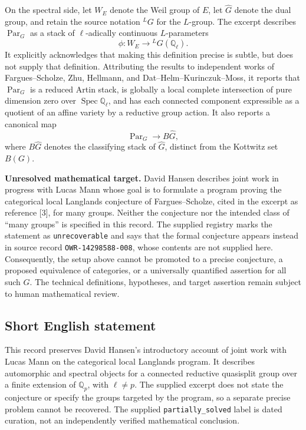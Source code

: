\documentclass[11pt]{article}
\newcommand{\Q}{\mathbb{Q}}
\begin{document}
On the spectral side, let \(W_E\) denote the Weil group of \(E\), let \(\widehat G\) denote the dual group, and retain the source notation \({}^{L}G\) for the \(L\)-group. The excerpt describes \(\operatorname{Par}_G\) as a stack of \(\ell\)-adically continuous \(L\)-parameters
\[
\phi:W_E\longrightarrow {}^{L}G(\Q_\ell).
\]
It explicitly acknowledges that making this definition precise is subtle, but does not supply that definition. Attributing the results to independent works of Fargues--Scholze, Zhu, Hellmann, and Dat--Helm--Kurinczuk--Moss, it reports that \(\operatorname{Par}_G\) is a reduced Artin stack, is globally a local complete intersection of pure dimension zero over \(\operatorname{Spec}\Q_\ell\), and has each connected component expressible as a quotient of an affine variety by a reductive group action. It also reports a canonical map
\[
\operatorname{Par}_G\longrightarrow B\widehat G,
\]
where \(B\widehat G\) denotes the classifying stack of \(\widehat G\), distinct from the Kottwitz set \(B(G)\).

\textbf{Unresolved mathematical target.} David Hansen describes joint work in progress with Lucas Mann whose goal is to formulate a program proving the categorical local Langlands conjecture of Fargues--Scholze, cited in the excerpt as reference [3], for many groups. Neither the conjecture nor the intended class of ``many groups'' is specified in this record. The supplied registry marks the statement as \texttt{unrecoverable} and says that the formal conjecture appears instead in source record \texttt{OWR-14298588-008}, whose contents are not supplied here. Consequently, the setup above cannot be promoted to a precise conjecture, a proposed equivalence of categories, or a universally quantified assertion for all such \(G\). The technical definitions, hypotheses, and target assertion remain subject to human mathematical review.
\subsection{Short English statement}
This record preserves David Hansen's introductory account of joint work with Lucas Mann on the categorical local Langlands program. It describes automorphic and spectral objects for a connected reductive quasisplit group over a finite extension of \(\Q_p\), with \(\ell\ne p\). The supplied excerpt does not state the conjecture or specify the groups targeted by the program, so a separate precise problem cannot be recovered. The supplied \texttt{partially\_solved} label is dated curation, not an independently verified mathematical conclusion.
\end{document}
